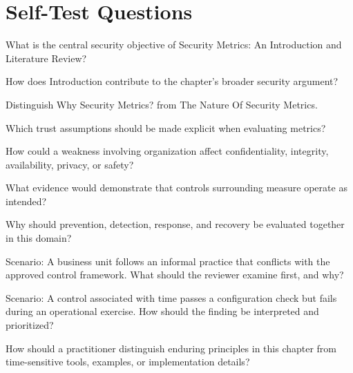 \documentclass[11pt,letterpaper]{article}
\begin{document}
\section*{Self-Test Questions}
\begin{CornellRecallList}
\item What is the central security objective of Security Metrics: An Introduction and Literature Review?
\item How does Introduction contribute to the chapter's broader security argument?
\item Distinguish Why Security Metrics? from The Nature Of Security Metrics.
\item Which trust assumptions should be made explicit when evaluating metrics?
\item How could a weakness involving organization affect confidentiality, integrity, availability, privacy, or safety?
\item What evidence would demonstrate that controls surrounding measure operate as intended?
\item Why should prevention, detection, response, and recovery be evaluated together in this domain?
\item Scenario: A business unit follows an informal practice that conflicts with the approved control framework. What should the reviewer examine first, and why?
\item Scenario: A control associated with time passes a configuration check but fails during an operational exercise. How should the finding be interpreted and prioritized?
\item How should a practitioner distinguish enduring principles in this chapter from time-sensitive tools, examples, or implementation details?
\end{CornellRecallList}
\end{document}
